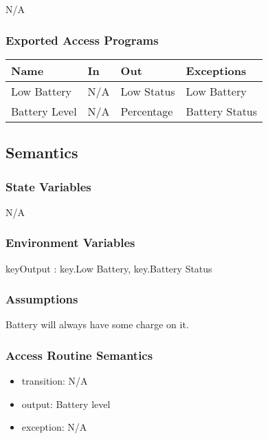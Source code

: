 \documentclass[12pt, titlepage]{article}
\begin{document}
N/A

\subsubsection{Exported Access Programs}

\begin{center}
\begin{tabular}{p{2cm} p{4cm} p{4cm} p{2cm}}
\hline
\textbf{Name} & \textbf{In} & \textbf{Out} & \textbf{Exceptions} \\
\hline
Low Battery & N/A & Low Status & Low Battery \\
\hline
Battery Level & N/A & Percentage & Battery Status \\
\hline
\end{tabular}
\end{center}

\subsection{Semantics}

\subsubsection{State Variables}

N/A

\subsubsection{Environment Variables}

keyOutput : {key.Low Battery, key.Battery Status}

\subsubsection{Assumptions}

Battery will always have some charge on it.

\subsubsection{Access Routine Semantics}

\noindent
\begin{itemize}
\item transition: N/A 
\item output: Battery level
\item exception: N/A
\end{itemize}
\end{document}
